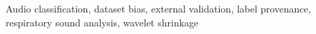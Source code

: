 Audio classification, dataset bias, external validation, label provenance, respiratory
sound analysis, wavelet shrinkage

